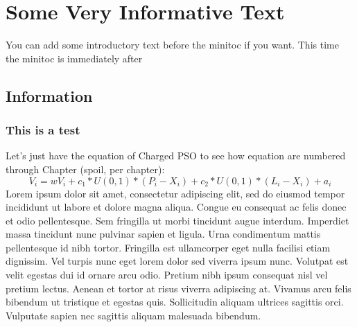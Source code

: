 \documentclass[../Thesis]{subfiles}
\begin{document}
\chapter{Some Very Informative Text}

You can add some introductory text before the minitoc if you want. This time the minitoc is immediately after

{
\minietoc
}

\section{Information}
\subsection{This is a test}

Let's just have the equation of Charged PSO to see how equation are numbered through Chapter (spoil, per chapter):
\begin{equation} 
    V_{i} = wV_{i} + c_{1} * U(0,1) * (P_{i} - X_{i}) + c_{2} * U(0,1) * (L_{i} - X_{i}) + a_{i} \label{eqn:velocityChargedUpdate} 
\end{equation} 
Lorem ipsum dolor sit amet, consectetur adipiscing elit, sed do eiusmod tempor incididunt ut labore et dolore magna aliqua. Congue eu consequat ac felis donec et odio pellentesque. Sem fringilla ut morbi tincidunt augue interdum. Imperdiet massa tincidunt nunc pulvinar sapien et ligula. Urna condimentum mattis pellentesque id nibh tortor. Fringilla est ullamcorper eget nulla facilisi etiam dignissim. Vel turpis nunc eget lorem dolor sed viverra ipsum nunc. Volutpat est velit egestas dui id ornare arcu odio. Pretium nibh ipsum consequat nisl vel pretium lectus. Aenean et tortor at risus viverra adipiscing at. Vivamus arcu felis bibendum ut tristique et egestas quis. Sollicitudin aliquam ultrices sagittis orci. Vulputate sapien nec sagittis aliquam malesuada bibendum.
\end{document}
